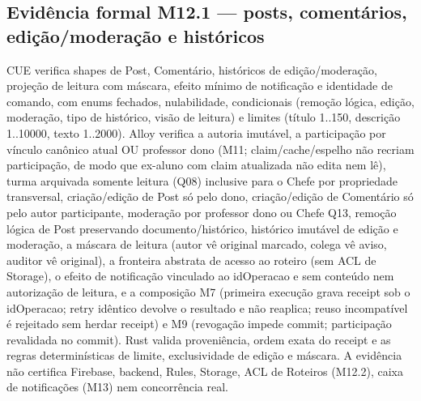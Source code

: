 \subsection*{Evidência formal M12.1 --- posts, comentários, edição/moderação e históricos}
CUE verifica shapes de Post, Comentário, históricos de edição/moderação, projeção de leitura com máscara, efeito mínimo de notificação e identidade de comando, com enums fechados, nulabilidade, condicionais (remoção lógica, edição, moderação, tipo de histórico, visão de leitura) e limites (título 1..150, descrição 1..10000, texto 1..2000). Alloy verifica a autoria imutável, a participação por vínculo canônico atual OU professor dono (M11; claim/cache/espelho não recriam participação, de modo que ex-aluno com claim atualizada não edita nem lê), turma arquivada somente leitura (Q08) inclusive para o Chefe por propriedade transversal, criação/edição de Post só pelo dono, criação/edição de Comentário só pelo autor participante, moderação por professor dono ou Chefe Q13, remoção lógica de Post preservando documento/histórico, histórico imutável de edição e moderação, a máscara de leitura (autor vê original marcado, colega vê aviso, auditor vê original), a fronteira abstrata de acesso ao roteiro (sem ACL de Storage), o efeito de notificação vinculado ao idOperacao e sem conteúdo nem autorização de leitura, e a composição M7 (primeira execução grava receipt sob o idOperacao; retry idêntico devolve o resultado e não reaplica; reuso incompatível é rejeitado sem herdar receipt) e M9 (revogação impede commit; participação revalidada no commit). Rust valida proveniência, ordem exata do receipt e as regras determinísticas de limite, exclusividade de edição e máscara. A evidência não certifica Firebase, backend, Rules, Storage, ACL de Roteiros (M12.2), caixa de notificações (M13) nem concorrência real.
